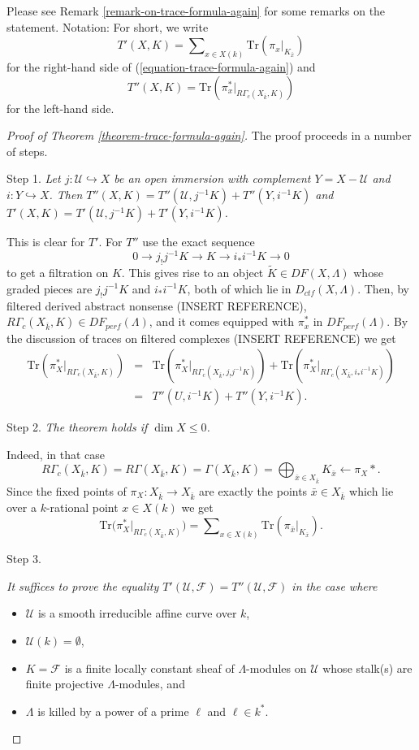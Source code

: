 \noindent
Please see Remark \ref{remark-on-trace-formula-again} for some remarks
on the statement. Notation: For short, we write
$$
T'(X, K) =
\sum\nolimits_{x\in X(k)}
\text{Tr}(\pi_x |_{K_{\bar x}})
$$
for the right-hand side of (\ref{equation-trace-formula-again}) and
$$
T''(X, K)
=\text{Tr}(\pi_x^* |_{R\Gamma_c(X_{\bar k}, K)})
$$
for the left-hand side.

\begin{proof}[Proof of Theorem \ref{theorem-trace-formula-again}]
The proof proceeds in a number of steps.

\medskip\noindent
Step 1. {\it Let $j : \mathcal{U}\hookrightarrow X$ be an open immersion with
complement $Y = X - \mathcal{U}$ and $i : Y \hookrightarrow X$. Then
$T''(X, K) = T''(\mathcal{U}, j^{-1} K)+ T''(Y, i^{-1}K)$ and
$T'(X, K) = T'(\mathcal{U}, j^{-1} K)+ T'(Y, i^{-1}K)$.}

\medskip\noindent
This is clear for $T'$. For $T''$ use the exact sequence
$$
0\to j_!j^{-1} K \to K \to i_* i^{-1} K \to 0
$$
to get a filtration on $K$. This gives rise to an object
$\widetilde K \in DF(X, \Lambda)$
whose graded pieces are $j_!j^{-1}K$ and $i_*i^{-1}K$,
both of which lie in $D_{ctf}(X, \Lambda)$. Then, by filtered derived
abstract nonsense (INSERT REFERENCE),
$R\Gamma_c(X_{\bar k}, K)\in DF_{perf}(\Lambda)$,
and it comes equipped with $\pi_x^*$ in
$DF_{perf}(\Lambda)$.
By the discussion of traces on filtered complexes (INSERT REFERENCE) we get
\begin{eqnarray*}
\text{Tr}(\pi_X^* |_{R\Gamma_c(X_{\bar k}, K)})
& = & \text{Tr}(\pi_X^* |_{R\Gamma_c(X_{\bar k}, j_!j^{-1}K)}) +
\text{Tr}(\pi_X^* |_{R\Gamma_c(X_{\bar k}, i_*i^{-1}K)}) \\
& = & T''(U, i^{-1}K) + T''(Y, i^{-1}K).
\end{eqnarray*}

\noindent
Step 2. {\it The theorem holds if $\dim X\leq 0$. }

\medskip\noindent
Indeed, in that case
$$
R\Gamma_c(X_{\bar k}, K) = R\Gamma(X_{\bar k}, K) = \Gamma(X_{\bar k}, K) =
\bigoplus\nolimits_{\bar x\in X_{\bar k}} K_{\bar x} \leftarrow \pi_X*.
$$
Since the fixed points of $\pi_X: X_{\bar k}\to X_{\bar k}$ are exactly the
points $\bar x\in X_{\bar k}$ which lie over a $k$-rational point $x\in X(k)$
we get
$$
\text{Tr}\big(\pi_X^*|_{R\Gamma_c(X_{\bar k}, K)}\big) =
\sum\nolimits_{x\in X(k)}\text{Tr}(\pi_{\bar x}|_{K_{\bar x}}).
$$

\medskip\noindent
Step 3. {\it It suffices to prove the equality
$T'(\mathcal{U}, \mathcal{F}) = T''(\mathcal{U}, \mathcal{F})$
in the case where
\begin{itemize}
\item $\mathcal{U}$ is a smooth irreducible affine curve over $k$,
\item $\mathcal{U}(k) = \emptyset$,
\item $K=\mathcal{F}$ is a finite locally constant sheaf of $\Lambda$-modules
on $\mathcal{U}$ whose stalk(s) are finite projective $\Lambda$-modules, and
\item $\Lambda$ is killed by a power of a prime $\ell$ and $\ell \in k^*$.
\end{itemize}
}


\end{proof}
